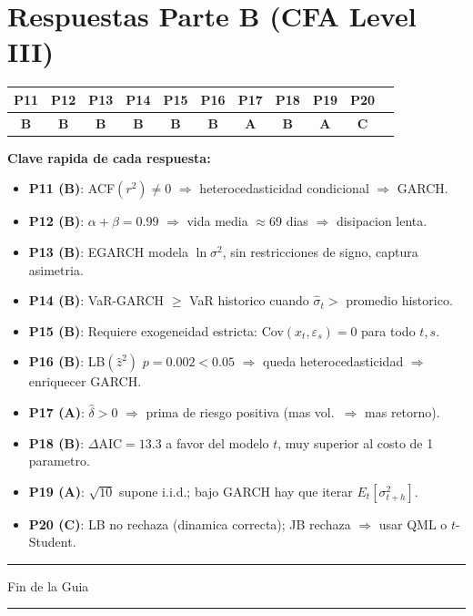 \documentclass[12pt,a4paper]{article}
\begin{document}
\section{Respuestas Parte B (CFA Level III)}

\begin{center}
\renewcommand{\arraystretch}{1.3}
\begin{tabular}{ccccccccccc}
  \toprule
  P11 & P12 & P13 & P14 & P15 & P16 & P17 & P18 & P19 & P20 \\
  \midrule
  \textbf{B} & \textbf{B} & \textbf{B} & \textbf{B} & \textbf{B}
  & \textbf{B} & \textbf{A} & \textbf{B} & \textbf{A} & \textbf{C} \\
  \bottomrule
\end{tabular}
\end{center}

\bigskip

\begin{resultado}
\textbf{Clave rapida de cada respuesta:}
\begin{itemize}[nosep]
  \item \textbf{P11 (B)}: ACF$(r^2)\neq 0$ $\Rightarrow$ heterocedasticidad condicional $\Rightarrow$ GARCH.
  \item \textbf{P12 (B)}: $\alpha+\beta=0.99$ $\Rightarrow$ vida media $\approx 69$ dias $\Rightarrow$ disipacion lenta.
  \item \textbf{P13 (B)}: EGARCH modela $\ln\sigma^2$, sin restricciones de signo, captura asimetria.
  \item \textbf{P14 (B)}: VaR-GARCH $\geq$ VaR historico cuando $\hat{\sigma}_t >$ promedio historico.
  \item \textbf{P15 (B)}: Requiere exogeneidad estricta: Cov$(x_t,\varepsilon_s)=0$ para todo $t,s$.
  \item \textbf{P16 (B)}: LB$(\hat{z}^2)$ $p=0.002<0.05$ $\Rightarrow$ queda heterocedasticidad $\Rightarrow$ enriquecer GARCH.
  \item \textbf{P17 (A)}: $\hat{\delta}>0$ $\Rightarrow$ prima de riesgo positiva (mas vol.\ $\Rightarrow$ mas retorno).
  \item \textbf{P18 (B)}: $\Delta$AIC$=13.3$ a favor del modelo $t$, muy superior al costo de 1 parametro.
  \item \textbf{P19 (A)}: $\sqrt{10}$ supone i.i.d.; bajo GARCH hay que iterar $E_t[\sigma^2_{t+h}]$.
  \item \textbf{P20 (C)}: LB no rechaza (dinamica correcta); JB rechaza $\Rightarrow$ usar QML o $t$-Student.
\end{itemize}
\end{resultado}

\vfill
\begin{center}
  \textcolor{midgray}{\small\rule{4cm}{0.3pt}\quad Fin de la Guia\quad\rule{4cm}{0.3pt}}
\end{center}
\end{document}
